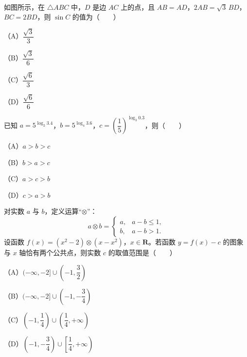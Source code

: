 \begin{question}
如图所示，在 $\triangle ABC$ 中，$D$ 是边 $AC$ 上的点，且 $AB=AD$，$2AB=\sqrt3\,BD$，$BC=2BD$，则 $\sin C$ 的值为\mbox{（　　）}

（A）$\dfrac{\sqrt3}{3}$

（B）$\dfrac{\sqrt3}{6}$

（C）$\dfrac{\sqrt6}{3}$

（D）$\dfrac{\sqrt6}{6}$
\nopagebreak[4]
\begin{center}\end{center}
\nopagebreak[4]
\end{question}
\begin{question}
已知 $a=5^{\log_2 3.4}$，$b=5^{\log_4 3.6}$，$c=\left(\dfrac15\right)^{\log_3 0.3}$，则\mbox{（　　）}

（A）$a>b>c$

（B）$b>a>c$

（C）$a>c>b$

（D）$c>a>b$

\end{question}
\begin{question}
对实数 $a$ 与 $b$，定义运算“$\otimes$”：
\nopagebreak[4]
\[a\otimes b=\begin{cases}a,& a-b\leqslant1,\\ b,& a-b>1.\end{cases}\]
设函数 $f(x)=(x^2-2)\otimes(x-x^2)$，$x\in\mathbf{R}$。若函数 $y=f(x)-c$ 的图象与 $x$ 轴恰有两个公共点，则实数 $c$ 的取值范围是\mbox{（　　）}

（A）$(-\infty,-2]\cup\left(-1,\dfrac32\right)$

（B）$(-\infty,-2]\cup\left(-1,-\dfrac34\right)$

（C）$\left(-1,\dfrac14\right)\cup\left(\dfrac14,+\infty\right)$

（D）$\left(-1,-\dfrac34\right)\cup\left[\dfrac14,+\infty\right)$

\end{question}


